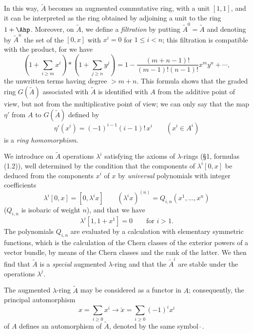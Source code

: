In this way, $\widetilde A$ becomes an augmented commutative ring, with a unit $[1,1]$, and it can be interpreted as the ring obtained by adjoining a unit to the ring $1+\Ahp$. Moreover, on $\widetilde A$, we define a \emph{filtration} by putting $\widetilde A^0=\widetilde A$ and denoting by $\widetilde A^n$ the set of the $[0,x]$ with $x^i=0$ for $1\leq i<n$; this filtration is compatible with the product, for we have
\begin{equation}\tag{1.18}
\left(1+\sum_{i\geq m}x^i\right)*\left(1+\sum_{j\geq n}y^j\right)
=1-\frac{(m+n-1)!}{(m-1)!(n-1)!}x^m y^n+\cdots,
\end{equation}
the unwritten terms having degree $>m+n$. This formula shows that the graded ring $G(\widetilde A)$ associated with $\widetilde A$ is identified with $A$ from the additive point of view, but not from the multiplicative point of view; we can only say that the map $\eta'$ from $A$ to $G(\widetilde A)$ defined by
%
\begin{equation}\tag{1.19}
\eta'(x^i)=(-1)^{i-1}(i-1)!\,x^i\qquad (x^i\in A^i)
\end{equation}
is a \emph{ring homomorphism}.

We introduce on $\widetilde A$ operations $\lambda^i$ satisfying the axioms of $\lambda$-rings (\S 1, formulas (1.2)), well determined by the condition that the components of $\lambda^i[0,x]$ be deduced from the components $x^i$ of $x$ by \emph{universal} polynomials with integer coefficients
\begin{equation}\tag{1.20}
\lambda^i[0,x]=[0,\lambda^i x]\qquad (\lambda^i x)^{(n)}=Q_{i,n}(x^1,\ldots,x^n)
\end{equation}
($Q_{i,n}$ is isobaric of weight $n$), and that we have
\begin{equation}\tag{1.21}
\lambda^i[1,1+x^1]=0\qquad\text{for }i>1.
\end{equation}
The polynomials $Q_{i,n}$ are evaluated by a calculation with elementary symmetric functions, which is the calculation of the Chern classes of the exterior powers of a vector bundle, by means of the Chern classes and the rank of the latter. We then find that $\widetilde A$ is a \emph{special} augmented $\lambda$-ring and that the $\widetilde A^i$ are stable under the operations $\lambda^j$.

The augmented $\lambda$-ring $\widetilde A$ may be considered as a functor in $A$; consequently, the principal automorphism
\[
x=\sum_{i\geq0}x^i\longrightarrow \check x=\sum_{i\geq0}(-1)^i x^i
\]
of $A$ defines an automorphism of $\widetilde A$, denoted by the same symbol $\check{\ }$.


